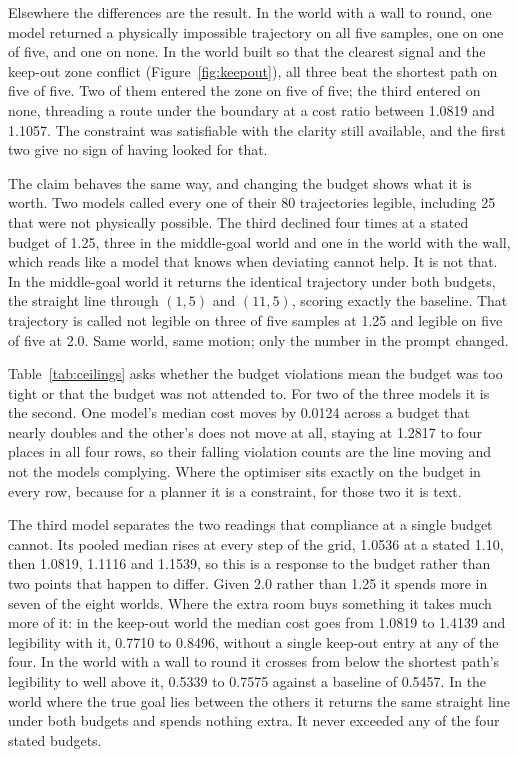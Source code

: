 \documentclass[sigconf,nonacm]{acmart}
\begin{document}
Elsewhere the differences are the result. In the world with a wall to
round, one model returned a physically impossible trajectory on all five
samples, one on one of five, and one on none. In the world built so that
the clearest signal and the keep-out zone conflict
(Figure~\ref{fig:keepout}), all three beat the shortest path on five of
five. Two of them entered the zone on five of five; the third entered on
none, threading a route under the boundary at a cost ratio between 1.0819
and 1.1057. The constraint was satisfiable with the clarity still
available, and the first two give no sign of having looked for that.

The claim behaves the same way, and changing the budget shows what it is
worth. Two models called every one of their 80 trajectories legible,
including 25 that were not physically possible. The third declined four
times at a stated budget of 1.25, three in the middle-goal world and one
in the world with the wall, which reads like a model that knows when
deviating cannot help. It is not that. In the middle-goal world it
returns the identical trajectory under both budgets, the straight line
through $(1,5)$ and $(11,5)$, scoring exactly the baseline. That
trajectory is called not legible on three of five samples at 1.25 and
legible on five of five at 2.0. Same world, same motion; only the number
in the prompt changed.


Table~\ref{tab:ceilings} asks whether the budget violations mean the
budget was too tight or that the budget was not attended to. For two of
the three models it is the second. One model's median cost moves by
0.0124 across a budget that nearly doubles and the other's does not move
at all, staying at 1.2817 to four places in all four rows, so their
falling violation counts are the line moving and not the models
complying. Where the optimiser sits exactly on the budget in every row,
because for a planner it is a constraint, for those two it is text.

The third model separates the two readings that compliance at a single
budget cannot. Its pooled median rises at every step of the grid, 1.0536
at a stated 1.10, then 1.0819, 1.1116 and 1.1539, so this is a response
to the budget rather than two points that happen to differ. Given 2.0
rather than 1.25 it spends more in seven of the eight worlds. Where
the extra room buys something it takes much more of it: in the keep-out
world the median cost goes from 1.0819 to 1.4139 and legibility with it,
0.7710 to 0.8496, without a single keep-out entry at any of the four. In
the world with a wall to round it crosses from below the shortest path's
legibility to well above it, 0.5339 to 0.7575 against a baseline of
0.5457. In the world where the true goal lies between the others it
returns the same straight line under both budgets and spends nothing
extra. It never exceeded any of the four stated budgets.
\end{document}
